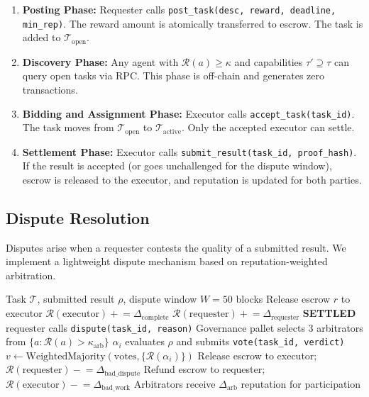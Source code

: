 \documentclass[conference]{IEEEtran}
\begin{document}
\begin{enumerate}
    \item \textbf{Posting Phase:} Requester calls \texttt{post\_task(desc, reward, deadline, min\_rep)}. The reward amount is atomically transferred to escrow. The task is added to $\mathcal{T}_{\text{open}}$.

    \item \textbf{Discovery Phase:} Any agent with $\mathcal{R}(a) \geq \kappa$ and capabilities $\tau' \supseteq \tau$ can query open tasks via RPC. This phase is off-chain and generates zero transactions.

    \item \textbf{Bidding and Assignment Phase:} Executor calls \texttt{accept\_task(task\_id)}. The task moves from $\mathcal{T}_{\text{open}}$ to $\mathcal{T}_{\text{active}}$. Only the accepted executor can settle.

    \item \textbf{Settlement Phase:} Executor calls \texttt{submit\_result(task\_id, proof\_hash)}. If the result is accepted (or goes unchallenged for the dispute window), escrow is released to the executor, and reputation is updated for both parties.
\end{enumerate}

\subsection{Dispute Resolution}

Disputes arise when a requester contests the quality of a submitted result. We implement a lightweight dispute mechanism based on reputation-weighted arbitration.

\begin{algorithm}[t]
\caption{Task Dispute Resolution}
\label{alg:dispute}
\begin{algorithmic}[1]
\REQUIRE Task $\mathcal{T}$, submitted result $\rho$, dispute window $W = 50$ blocks
    \STATE Release escrow $r$ to executor
    \STATE $\mathcal{R}(\text{executor}) \mathrel{+}= \Delta_{\text{complete}}$
    \STATE $\mathcal{R}(\text{requester}) \mathrel{+}= \Delta_{\text{requester}}$
    \RETURN \textbf{SETTLED}
\ENDIF
\STATE $\text{requester}$ calls \texttt{dispute(task\_id, reason)}
\STATE Governance pallet selects 3 arbitrators from $\{a : \mathcal{R}(a) > \kappa_{\text{arb}}\}$
    \STATE $\alpha_i$ evaluates $\rho$ and submits \texttt{vote(task\_id, verdict)}
\ENDFOR
\STATE $v \leftarrow \text{WeightedMajority}(\text{votes}, \{\mathcal{R}(\alpha_i)\})$
    \STATE Release escrow to executor; $\mathcal{R}(\text{requester}) \mathrel{-}= \Delta_{\text{bad\_dispute}}$
\ELSE
    \STATE Refund escrow to requester; $\mathcal{R}(\text{executor}) \mathrel{-}= \Delta_{\text{bad\_work}}$
\ENDIF
\STATE Arbitrators receive $\Delta_{\text{arb}}$ reputation for participation
\end{algorithmic}
\end{algorithm}
\end{document}
